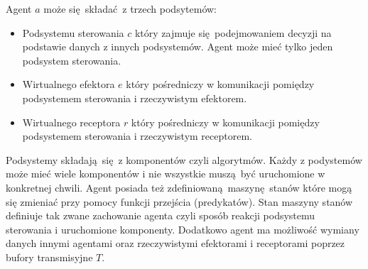 Agent $a$ może się składać z trzech podsytemów:
\begin{itemize}
	\item Podsystemu sterowania $c$ który zajmuje się podejmowaniem decyzji na podstawie danych z innych podsystemów. Agent może mieć tylko jeden podsystem sterowania.
	\item Wirtualnego efektora $e$ który pośredniczy w komunikacji pomiędzy podsystemem sterowania i rzeczywistym efektorem.
	\item Wirtualnego receptora $r$ który pośredniczy w komunikacji pomiędzy podsystemem sterowania i rzeczywistym receptorem.
\end{itemize}
Podsystemy składają się z komponentów czyli algorytmów. Każdy z podystemów może mieć wiele komponentów i nie wszystkie muszą być uruchomione w konkretnej chwili. Agent posiada też zdefiniowaną maszynę stanów które mogą się zmieniać przy pomocy funkcji przejścia (predykatów). Stan maszyny stanów definiuje tak zwane zachowanie agenta czyli sposób reakcji podsystemu sterowania i uruchomione komponenty. Dodatkowo agent ma możliwość wymiany danych innymi agentami oraz rzeczywistymi efektorami i receptorami poprzez bufory transmisyjne $T$. 